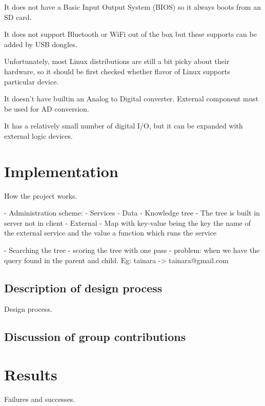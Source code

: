 It does not have a Basic Input Output System (BIOS) so it always boots from an SD card.

It does not support Bluetooth or WiFi out of the box but these supports can be added by USB dongles.

Unfortunately, most Linux distributions are still a bit
picky about their hardware, so it should be first checked whether flavor of Linux supports particular device.

It doesn’t have builtin an Analog to Digital converter. External component must be used for AD conversion.

It has a relatively small number of digital I/O, but it can be expanded with external logic devices.

\section{Implementation}



How the project works.

- Administration scheme:
    - Services
        - Data
            - Knowledge tree
                - The tree is built in server not in client
        - External
            - Map with key-value being the key the name of the external service and the value a function which runs the service

- Searching the tree
    - scoring the tree with one pass
    - problem: when we have the query found in the parent and child. Eg: tainara -> tainara@gmail.com

\subsection{Description of design process}
Design process.

\subsection{Discussion of group contributions}



\section{Results}

Failures and successes.


